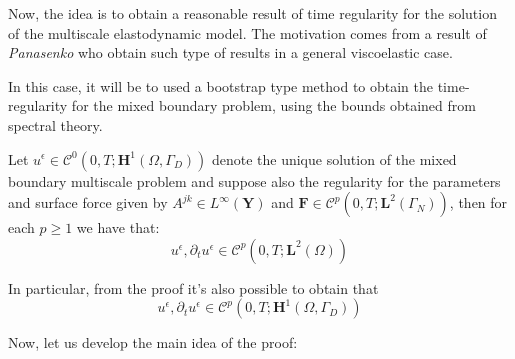 
Now, the idea is to obtain a reasonable result of time regularity for the solution of the multiscale elastodynamic model. The motivation comes from a result of \textit{Panasenko} who obtain such type of results in a general viscoelastic case.

In this case, it will be to used a bootstrap type method to obtain the time-regularity for the mixed boundary problem, using the bounds obtained from spectral theory.

\begin{prop}
\label{BootstrapingProp}
Let $u^{\epsilon} \in \mathcal{C}^{0}(0,T; \mathbf{H}^1(\Omega, \Gamma_D))$ denote the unique solution of the mixed boundary multiscale problem and suppose also the regularity for the parameters and surface force given by $A^{jk} \in L^{\infty}(\mathbf{Y})$ and $\mathbf{F} \in \mathcal{C}^p(0,T; \mathbf{L}^{2}(\Gamma_N))$, then for each $p \geq 1$ we have that:
\begin{equation*}
    u^{\epsilon}, \partial_t u^{\epsilon} \in \mathcal{C}^p(0,T; \mathbf{L}^2(\Omega))
\end{equation*}
\end{prop}
\begin{rem}
In particular, from the proof it's also possible to obtain that
\begin{equation*}
    u^{\epsilon}, \partial_t u^{\epsilon} \in \mathcal{C}^p(0,T; \mathbf{H}^1(\Omega, \Gamma_D))
\end{equation*}
\end{rem}
Now, let us develop the main idea of the proof:\\
